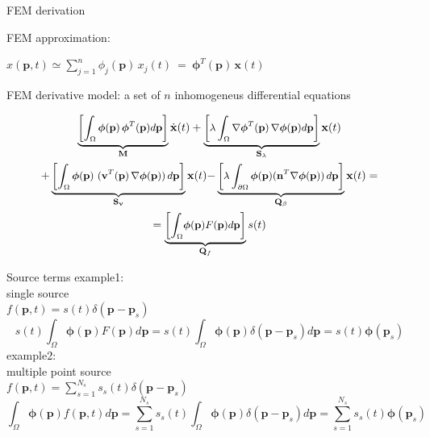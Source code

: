 \documentclass{beamer}
\newcommand{\mb}{\mathbf}
\newcommand{\bs}{\boldsymbol}
\begin{document}
\begin{frame}{FEM derivation}

FEM approximation:\\
\begin{center}

$	x(\mb{p},t) \simeq \sum_{j=1}^{n} \phi_{j}(\mb{p}) \, x_j(t) ~=~ \boldsymbol{\phi}^T(\mb{p}) \, \mb{x}(t)$

\end{center}
\vspace{0.1cm}

FEM derivative model:
a set of $n$ inhomogeneus differential equations

\begin{multline} 
\small{\underbrace{\left[ \int_\Omega  
			\bs{\phi}(\mb{p}) \,\bs{\phi}^T(\mb{p}) d\mb{p} 
			\right]}_{\mb{M}} \dot{\mb{x}}(t)  + 
		\underbrace{\left[ \lambda \int_\Omega 
			\nabla	\bs{\phi}^T(\mb{p}) \,\nabla \bs{\phi}(\mb{p}) d\mb{p} 
			\right]}_{\mb{S}_\lambda} \mb{x}(t) }\\
\small{+ \underbrace{\left[ \int_\Omega 
			\bs{\phi}(\mb{p}) ~ (\mb{v}^T(\mb{p}) \,\nabla \bs{\phi}(\mb{p}) )\, d\mb{p} 
			\right]}_{\mb{S}_\mb{v}} \mb{x}(t) }
	\small{- \underbrace{\left[ \lambda \int_{\partial \Omega} 
			 \bs{\phi}(\mb{p}) (\mb{n}^T \nabla \bs{\phi}(\mb{p})) \, d\mb{p}
			\right]}_{\mb{Q}_\beta} \mb{x}(t) = }\\
	=  \small{\underbrace{\left[\displaystyle{\int_\Omega} \bs{\phi}(\mb{p})
			F(\mb{p}) d\mb{p}	\right]}_{\mb{Q}_f} {s}(t) }
\end{multline} 
\end{frame}
\begin{frame}{Source terms}
example1: \\
single source\\
$f(\mb{p},t)=s(t)\delta(\mb{p}-\mb{p}_s)$\\
$$s(t)\int_\Omega \bs{\phi}(\mb{p})
			F(\mb{p}) d\mb{p} = s(t)\int_\Omega \bs{\phi}(\mb{p})
			\delta(\mb{p}-\mb{p}_s) d\mb{p}=s(t)\bs{\phi}(\mb{p}_s)$$
example2:\\
multiple point source\\
\vspace{1mm}
$f(\mb{p},t)=\sum_{s=1}^{N_s} s_s(t) \delta(\mb{p}-\mb{p}_s)$\\
$$\int_\Omega \bs{\phi}(\mb{p})
			f(\mb{p},t) d\mb{p} = \sum_{s=1}^{N_s} s_s(t) \int_\Omega \bs{\phi}(\mb{p})
			\delta(\mb{p}-\mb{p}_s) d\mb{p}= \sum_{s=1}^{N_s} s_s(t) \bs{\phi}(\mb{p}_s)$$\\
\end{frame}
\end{document}
